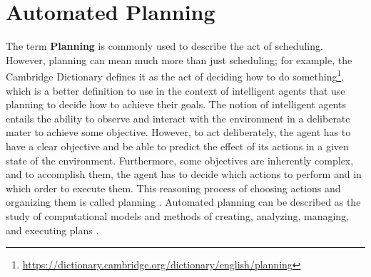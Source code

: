 \section{Automated Planning}

The term \textbf{Planning} is commonly used to describe the act of 
scheduling. However, planning can mean much more than just
scheduling; for example, the Cambridge Dictionary defines 
it as the act of deciding how to do something\footnote{\url{https://dictionary.cambridge.org/dictionary/english/planning}}, 
which is a better definition to use in the context of intelligent agents that 
use planning to decide how to achieve their goals. The notion of intelligent agents entails the ability to observe and interact 
with the environment in a deliberate mater to achieve some objective. 
However, to act deliberately, the agent has to have a clear objective 
and be able to predict the effect of its actions in a given state of 
the environment. Furthermore, some objectives are inherently complex, and to accomplish them, 
the agent has to decide which actions to perform and in which order to execute 
them. This reasoning process of choosing actions and organizing them 
is called planning \cite{AutomatedPlanningTheoryghallab2006}. 
Automated planning can be described as the study of computational models and methods 
of creating, analyzing, managing, and 
executing plans \cite{IntroductionPlanningDomainhaslum2019}.



